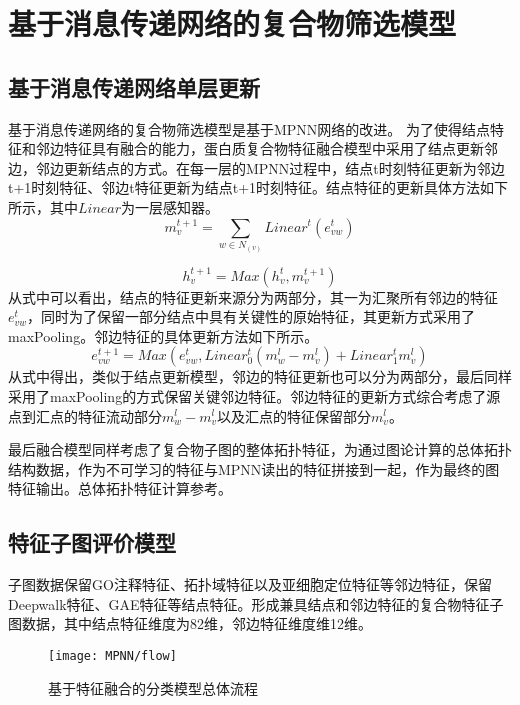 \section{基于消息传递网络的复合物筛选模型}
\label{section:MPNN:detail}
\subsection{基于消息传递网络单层更新}
基于消息传递网络的复合物筛选模型是基于MPNN网络的改进。
为了使得结点特征和邻边特征具有融合的能力，蛋白质复合物特征融合模型中采用了结点更新邻边，邻边更新结点的方式。在每一层的MPNN过程中，结点t时刻特征更新为邻边t+1时刻特征、邻边t特征更新为结点t+1时刻特征。结点特征的更新具体方法如下所示，其中$Linear$为一层感知器。
\begin{equation}
    \label{equ:MineMPNNPassing}
    m_v^{t+1} = \sum_{w \in N_{(v)}}Linear^t(e_{vw}^t)
\end{equation}

\begin{equation}
    \label{equ:MineMPNNReadout}
    h_v^{t+1} = Max(h_v^t,m_v^{t+1})
\end{equation}
从式中可以看出，结点的特征更新来源分为两部分，其一为汇聚所有邻边的特征$e_{vw}^t$，同时为了保留一部分结点中具有关键性的原始特征，其更新方式采用了maxPooling。邻边特征的具体更新方法如下所示。
\begin{equation}
    \label{equ:MineMPNNedge}
    e_{vw}^{t+1} = Max(e_{vw}^t,Linear_0^t(m_w^{l} - m_v^{l}) + Linear_1^t m_v^{l})
\end{equation}
从式中得出，类似于结点更新模型，邻边的特征更新也可以分为两部分，最后同样采用了maxPooling的方式保留关键邻边特征。邻边特征的更新方式综合考虑了源点到汇点的特征流动部分$m_w^{l} - m_v^{l}$以及汇点的特征保留部分$m_v^{l}$。


最后融合模型同样考虑了复合物子图的整体拓扑特征，为通过图论计算的总体拓扑结构数据，作为不可学习的特征与MPNN读出的特征拼接到一起，作为最终的图特征输出。总体拓扑特征计算参考\cite{yu_predicting_2014}。

\subsection{特征子图评价模型}

子图数据保留GO注释特征、拓扑域特征以及亚细胞定位特征等邻边特征，保留Deepwalk特征、GAE特征等结点特征。形成兼具结点和邻边特征的复合物特征子图数据，其中结点特征维度为82维，邻边特征维度维12维。

\begin{figure}[htbp]
    \centering
    \texttt{[image: MPNN/flow]}
    \caption{基于特征融合的分类模型总体流程}
    \label{fig:MPNN/flow}
\end{figure}

